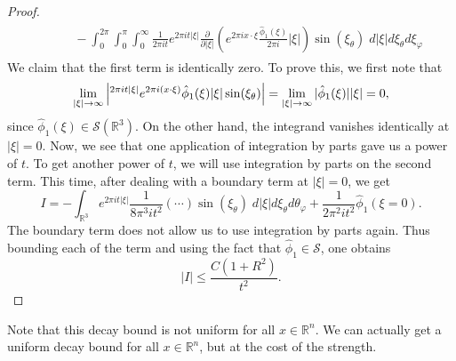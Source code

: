 \documentclass{article}
\begin{document}
\begin{proof}
\begin{align*}
\begin{split}
			&\qquad - \int_0^{2\pi}\int_0^\pi\int_0^\infty \frac{1}{2\pi i t} e^{2\pi i t|\xi|} \frac{\partial}{\partial |\xi|}\left(e^{2\pi i x \cdot \xi}\frac{\hat{\phi}_1(\xi)}{2\pi i}|\xi|\right)\sin(\xi_\theta)\;d|\xi| d\xi_\theta d\xi_\varphi
		\end{split}
	\end{align*}
	We claim that the first term is identically zero. To prove this, we first note that 
	\begin{equation*}
		\lim_{|\xi|\to \infty}\left| ^{2\pi i t |\xi|}e^{2\pi i (x \cdot \xi)}\hat{\phi}_1(\xi) |\xi| \sin(\xi_\theta) \right| = \lim_{|\xi| \to \infty}|\hat{\phi}_1(\xi)||\xi| = 0, 
	\end{equation*}
	since $\hat{\phi}_1(\xi) \in \mathcal{S}(\mathbb{R}^3)$. On the other hand, the integrand vanishes identically at $|\xi| = 0$. Now, we see that one application of integration by parts gave us a power of $t$. To get another power of $t$, we will use integration by parts on the second term. This time, after dealing with a boundary term at $|\xi| = 0$, we get 
	\begin{equation*}
		I = -\int_{\mathbb{R}^3}e^{2\pi i t|\xi|}\frac{1}{8\pi^3it^2}\left(\dotsm\right)\sin(\xi_\theta)\;d|\xi|d\xi_\theta d\theta_\varphi + \frac{1}{2\pi^2 i t^2}\hat{\phi}_1(\xi = 0). 
	\end{equation*}
	The boundary term does not allow us to use integration by parts again. Thus bounding each of the term and using the fact that $\hat{\phi}_1 \in \mathcal{S}$, one obtains 
	\begin{equation*}
		|I| \leq \frac{C(1 + R^2)}{t^2}. 
	\end{equation*}
\end{proof}

Note that this decay bound is not uniform for all $x \in \mathbb{R}^n$.  We can actually get a uniform decay bound for all $x \in \mathbb{R}^{n}$, but at the cost of the strength. 
\end{document}
